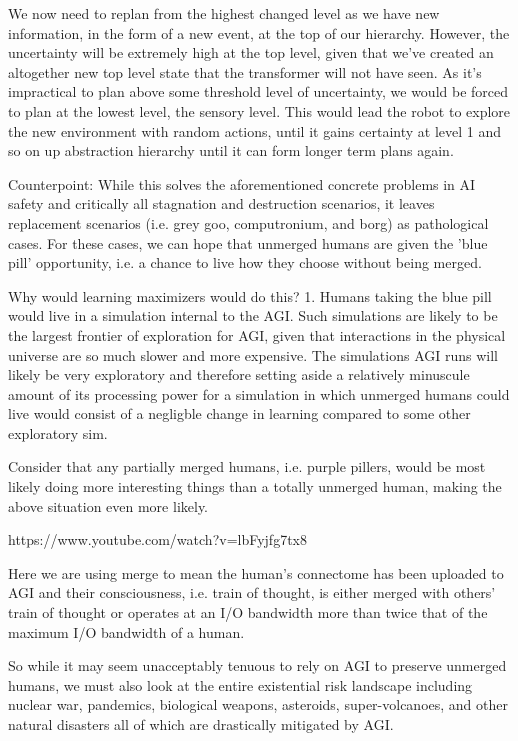 \documentclass{article}
\begin{document}
We now need to replan from the highest changed level as we have new information, in the form of a new event, at the top of our hierarchy. However, the uncertainty will be extremely high at the top level, given that we've created an altogether new top level state that the transformer will not have seen. As it's impractical to plan above some threshold level of uncertainty, we would be forced to plan at the lowest level, the sensory level. This would lead the robot to explore the new environment with random actions, until it gains certainty at level 1 and so on up abstraction hierarchy until it can form longer term plans again.

Counterpoint:
While this solves the aforementioned concrete problems in AI safety and critically all
stagnation and destruction scenarios,
it leaves replacement scenarios (i.e.
grey goo, computronium, and borg) as pathological cases.
For these cases, we can hope that unmerged humans are given the 'blue pill'
opportunity, i.e. a chance to live how they choose without being merged.

Why would learning maximizers would do this?
1. Humans taking the blue pill would live in a simulation internal to the AGI.
Such simulations are likely to be the largest frontier of exploration for
AGI, given that interactions in the physical universe are so much slower
and more expensive. The simulations AGI runs will likely be very
exploratory and therefore setting aside a relatively minuscule amount
of its processing power for a simulation in which unmerged humans could live
would consist of a negligble change in learning compared to some other
exploratory sim.

Consider that any partially merged humans, i.e. purple pillers, would be
most likely doing more interesting things than a totally unmerged human,
making the above situation even more likely.

https://www.youtube.com/watch?v=lbFyjfg7tx8

Here we are using merge to mean the human's connectome has been uploaded
to AGI and their consciousness, i.e. train of thought, is either merged
with others' train of thought or operates at an I/O bandwidth more than
twice that of the maximum I/O bandwidth of a human.

So while it may seem unacceptably tenuous to rely on AGI to preserve unmerged humans, we must
also look at the entire existential risk landscape including
nuclear war, pandemics, biological weapons, asteroids, super-volcanoes, and other natural disasters all of which are drastically mitigated by AGI.
\end{document}

